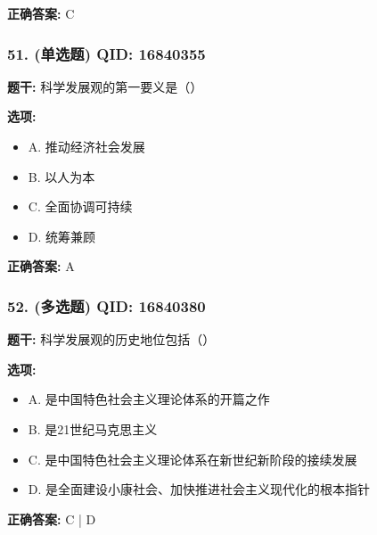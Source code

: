 \documentclass[12pt,UTF8]{ctexart}
\begin{document}
\textbf{正确答案:}
C

\vspace{0.3em}\hrulefill\vspace{0.7em}

\subsubsection*{51. (单选题) \small QID: 16840355}

\textbf{题干:}
科学发展观的第一要义是（）

\textbf{选项:}
\begin{itemize}[leftmargin=*]

  \item A. 推动经济社会发展

  \item B. 以人为本

  \item C. 全面协调可持续

  \item D. 统筹兼顾

\end{itemize}

\textbf{正确答案:}
A

\vspace{0.3em}\hrulefill\vspace{0.7em}

\subsubsection*{52. (多选题) \small QID: 16840380}

\textbf{题干:}
科学发展观的历史地位包括（）

\textbf{选项:}
\begin{itemize}[leftmargin=*]

  \item A. 是中国特色社会主义理论体系的开篇之作

  \item B. 是21世纪马克思主义

  \item C. 是中国特色社会主义理论体系在新世纪新阶段的接续发展

  \item D. 是全面建设小康社会、加快推进社会主义现代化的根本指针

\end{itemize}

\textbf{正确答案:}
C | D

\vspace{0.3em}\hrulefill\vspace{0.7em}
\end{document}
